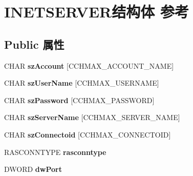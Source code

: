 \hypertarget{struct_i_n_e_t_s_e_r_v_e_r}{}\section{I\+N\+E\+T\+S\+E\+R\+V\+E\+R结构体 参考}
\label{struct_i_n_e_t_s_e_r_v_e_r}
\subsection*{Public 属性}
\begin{DoxyCompactItemize}
\item 
\mbox{\label{struct_i_n_e_t_s_e_r_v_e_r_a8df8c55cc4f43a8bf7bba0894300f9e6}} 
C\+H\+AR {\bfseries sz\+Account} \mbox{[}C\+C\+H\+M\+A\+X\+\_\+\+A\+C\+C\+O\+U\+N\+T\+\_\+\+N\+A\+ME\mbox{]}
\item 
\mbox{\label{struct_i_n_e_t_s_e_r_v_e_r_a3ebc4e190103f5350ca9afde54bed758}} 
C\+H\+AR {\bfseries sz\+User\+Name} \mbox{[}C\+C\+H\+M\+A\+X\+\_\+\+U\+S\+E\+R\+N\+A\+ME\mbox{]}
\item 
\mbox{\label{struct_i_n_e_t_s_e_r_v_e_r_a6731f8435bc5753986018a6dce7ce524}} 
C\+H\+AR {\bfseries sz\+Password} \mbox{[}C\+C\+H\+M\+A\+X\+\_\+\+P\+A\+S\+S\+W\+O\+RD\mbox{]}
\item 
\mbox{\label{struct_i_n_e_t_s_e_r_v_e_r_a47d69e5586622737c564bbe41c20e078}} 
C\+H\+AR {\bfseries sz\+Server\+Name} \mbox{[}C\+C\+H\+M\+A\+X\+\_\+\+S\+E\+R\+V\+E\+R\+\_\+\+N\+A\+ME\mbox{]}
\item 
\mbox{\label{struct_i_n_e_t_s_e_r_v_e_r_a00e0ee05223eda7688e84af461c64c40}} 
C\+H\+AR {\bfseries sz\+Connectoid} \mbox{[}C\+C\+H\+M\+A\+X\+\_\+\+C\+O\+N\+N\+E\+C\+T\+O\+ID\mbox{]}
\item 
\mbox{\label{struct_i_n_e_t_s_e_r_v_e_r_a3abbbc311006d7b6731ca129eac4dedf}} 
R\+A\+S\+C\+O\+N\+N\+T\+Y\+PE {\bfseries rasconntype}
\item 
\mbox{\label{struct_i_n_e_t_s_e_r_v_e_r_a11ce2194096ad1dfab73ac58829a4730}} 
D\+W\+O\+RD {\bfseries dw\+Port}
\item 

\end{DoxyCompactItemize}
